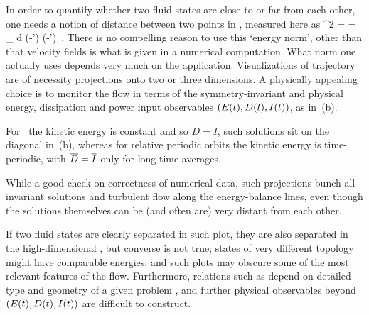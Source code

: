 \documentclass{jfm}
\begin{document}
In order to quantify whether two fluid states are close to or far from
each other, one needs a notion of distance between two points in
\statesp, measured here as
\beq
  ^2  =  =
\int_\bCell \! d \bx \;
(-') \cdot (-')
\,.
There is no compelling reason to use this {`energy norm'}, other than
that velocity fields is what is given in a numerical computation. What
norm one actually uses depends very much on the application.
Visualizations of trajectory  are of necessity
projections onto two or three dimensions. A physically appealing choice
is to monitor the flow in terms of the
symmetry-invariant and physical energy, dissipation and power input
observables $(E(t),D(t),I(t))$, as in
\,(b).

For \reqva\ the kinetic
energy is constant and so $D=I$, such solutions sit on the diagonal in
\,(b), whereas for relative periodic orbits the kinetic
energy is time-periodic, with $\overline{D}=\overline{I}$ only for
long-time averages.

While a good check on correctness of numerical data, such projections
bunch all invariant solutions and turbulent flow along the energy-balance
lines, even though the solutions themselves can be (and often are) very
distant from each other.

If two fluid states are clearly separated in
such plot, they are also separated in the high-dimensional \statesp, but
converse is not true; states of very different topology might have
comparable energies, and such plots may obscure some of the most relevant
features of the flow. Furthermore, relations such as 
depend on detailed type and geometry of a given problem
, and further physical observables beyond
$(E(t),D(t),I(t))$ are difficult to construct.
\end{document}
